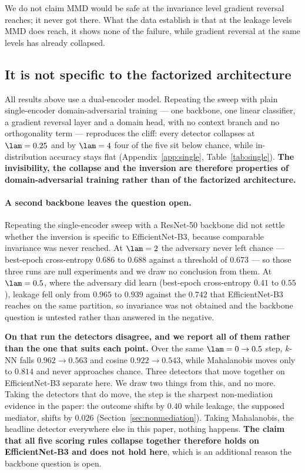 We do not claim MMD would be safe at the invariance level gradient reversal reaches; it
never got there. What the data establish is that at the leakage levels MMD does reach,
it shows none of the failure, while gradient reversal at the same levels has already
collapsed.

\subsection{It is not specific to the factorized architecture}
\label{sec:arch}

All results above use a dual-encoder model. Repeating the sweep with plain
single-encoder domain-adversarial training --- one backbone, one linear classifier, a
gradient reversal layer and a domain head, with no context branch and no orthogonality
term --- reproduces the cliff: every detector collapses at $\lam = 0.25$ and by
$\lam = 4$ four of the five sit below chance, while in-distribution accuracy stays flat
(Appendix~\ref{app:single}, Table~\ref{tab:single}). \textbf{The invisibility, the
collapse and the inversion are therefore properties of domain-adversarial training
rather than of the factorized architecture.}

\paragraph{A second backbone leaves the question open.} Repeating the single-encoder
sweep with a ResNet-50 backbone did not settle whether the inversion is specific to
EfficientNet-B3, because comparable invariance was never reached. At
$\lam = 2$ the adversary never left chance --- best-epoch cross-entropy $0.686$ to
$0.688$ against a threshold of $0.673$ --- so those three runs are null experiments and
we draw no conclusion from them. At $\lam = 0.5$, where the adversary did learn
(best-epoch cross-entropy $0.41$ to $0.55$), leakage fell only from $0.965$ to $0.939$
against the $0.742$ that EfficientNet-B3 reaches on the same partition, so invariance
was not obtained and the backbone question is untested rather than answered in the
negative.

\textbf{On that run the detectors disagree, and we report all of them rather than
the one that suits each point.} Over the same $\lam = 0 \to 0.5$ step, $k$-NN falls
$0.962 \to 0.563$ and cosine $0.922 \to 0.543$, while Mahalanobis moves only to
$0.814$ and never approaches chance. Three detectors that move together on
EfficientNet-B3 separate here. We draw two things from this, and no more. Taking
the detectors that do move, the step is the sharpest non-mediation evidence in the
paper: the outcome shifts by $0.40$ while leakage, the supposed mediator, shifts by
$0.026$ (Section~\ref{sec:nonmediation}). Taking Mahalanobis, the headline detector
everywhere else in this paper, nothing happens. \textbf{The claim that all five
scoring rules collapse together therefore holds on EfficientNet-B3 and does not
hold here}, which is an additional reason the backbone question is open.

